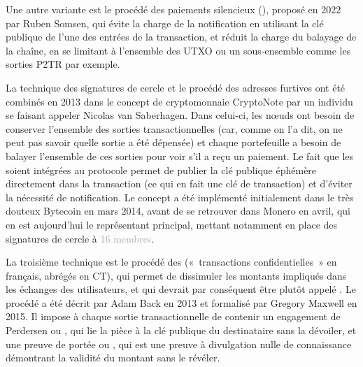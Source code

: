 Une autre variante est le procédé des paiements silencieux (), proposé en 2022 par Ruben Somsen, qui évite la charge de la notification en utilisant la clé publique de l'une des entrées de la transaction, et réduit la charge du balayage de la chaîne, en se limitant à l'ensemble des UTXO ou un sous-ensemble comme les sorties P2TR par exemple.

La technique des signatures de cercle et le procédé des adresses furtives ont été combinés en 2013 dans le concept de cryptomonnaie CryptoNote par un individu se faisant appeler Nicolas van Saberhagen. Dans celui-ci, les nœuds ont besoin de conserver l'ensemble des sorties transactionnelles (car, comme on l'a dit, on ne peut pas savoir quelle sortie a été dépensée) et chaque portefeuille a besoin de balayer l'ensemble de ces sorties pour voir s'il a reçu un paiement. Le fait que les  soient intégrées au protocole permet de publier la clé publique éphémère directement dans la transaction (ce qui en fait une clé de transaction) et d'éviter la nécessité de notification. Le concept a été implémenté initialement dans le très douteux Bytecoin en mars 2014, avant de se retrouver dans Monero en avril, qui en est aujourd'hui le représentant principal, mettant notamment en place des signatures de cercle à \textcolor{darkgray}{16 membres}.



La troisième technique est le procédé des  («~transactions confidentielles~» en français, abrégés en CT), qui permet de dissimuler les montants impliqués dans les échanges des utilisateurs, et qui devrait par conséquent être plutôt appelé . Le procédé a été décrit par Adam Back en 2013 et formalisé par Gregory Maxwell en 2015. Il impose à chaque sortie transactionnelle de contenir un engagement de Perdersen ou , qui lie la pièce à la clé publique du destinataire sans la dévoiler, et une preuve de portée ou , qui est une preuve à divulgation nulle de connaissance démontrant la validité du montant sans le révéler.

